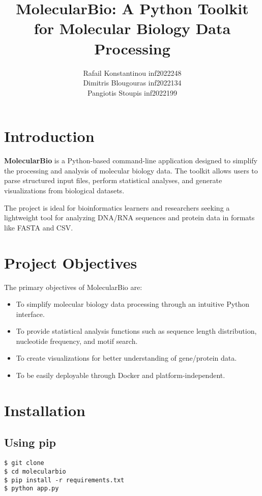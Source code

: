 \documentclass[11pt,a4paper]{article}
\title{MolecularBio: A Python Toolkit for Molecular Biology Data Processing}
\author{Rafail Konstantinou inf2022248\\
Dimitris Blougouras inf2022134\\
Pangiotis Stoupis inf2022199 \\ }
\begin{document}
\maketitle
\tableofcontents
\newpage

\section{Introduction}

\textbf{MolecularBio} is a Python-based command-line application designed to simplify the processing and analysis of molecular biology data. The toolkit allows users to parse structured input files, perform statistical analyses, and generate visualizations from biological datasets.

The project is ideal for bioinformatics learners and researchers seeking a lightweight tool for analyzing DNA/RNA sequences and protein data in formats like FASTA and CSV.

\section{Project Objectives}

The primary objectives of MolecularBio are:
\begin{itemize}
  \item To simplify molecular biology data processing through an intuitive Python interface.
  \item To provide statistical analysis functions such as sequence length distribution, nucleotide frequency, and motif search.
  \item To create visualizations for better understanding of gene/protein data.
  \item To be easily deployable through Docker and platform-independent.
\end{itemize}

\section{Installation}

\subsection{Using pip}

\begin{verbatim}
$ git clone 
$ cd molecularbio
$ pip install -r requirements.txt
$ python app.py
\end{verbatim}
\end{document}
